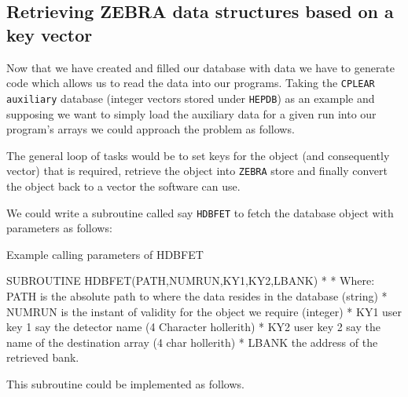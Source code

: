 \subsection{Retrieving ZEBRA data structures based on a key vector}
Now that we have created and filled our database with data we have to generate code
which allows us to read the data into our programs. Taking the
{\tt CPLEAR auxiliary}
database (integer vectors stored under {\tt HEPDB}) as an example and supposing
we want to simply load the auxiliary data for a given run into
our program's arrays we could approach the problem as follows.
\par
The general loop of tasks would be to set keys for the object (and consequently vector)
that is required, retrieve the object into {\tt ZEBRA} store and finally convert the
object back to a vector the software can use.
\par
We could write a subroutine called say {\tt HDBFET} to fetch the database object with
parameters as follows:
%
\begin{XMPt}{Example calling parameters of HDBFET}

      SUBROUTINE HDBFET(PATH,NUMRUN,KY1,KY2,LBANK)
*
*     Where: PATH   is the absolute path to where the data resides in the database (string)
*            NUMRUN is the instant of validity for the object we require (integer)
*            KY1    user key 1 say the detector name (4 Character hollerith)
*            KY2    user key 2 say the name of the destination array (4 char hollerith)
*            LBANK  the address of the retrieved bank.

\end{XMPt}
This subroutine could be implemented as follows.
